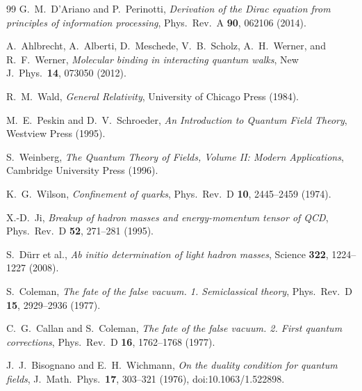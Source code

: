 \documentclass[12pt,a4paper]{article}
\theoremstyle{definition}
\theoremstyle{remark}
\begin{document}
\begin{thebibliography}{99}
G.~M.~D'Ariano and P.~Perinotti, \emph{Derivation of the Dirac equation from principles of information processing}, Phys.\ Rev.\ A \textbf{90}, 062106 (2014).

A.~Ahlbrecht, A.~Alberti, D.~Meschede, V.~B.~Scholz, A.~H.~Werner, and R.~F.~Werner, \emph{Molecular binding in interacting quantum walks}, New J.\ Phys.\ \textbf{14}, 073050 (2012).

R.~M.~Wald, \emph{General Relativity}, University of Chicago Press (1984).

M.~E.~Peskin and D.~V.~Schroeder, \emph{An Introduction to Quantum Field Theory}, Westview Press (1995).

S.~Weinberg, \emph{The Quantum Theory of Fields, Volume II: Modern Applications}, Cambridge University Press (1996).

K.~G.~Wilson, \emph{Confinement of quarks}, Phys.\ Rev.\ D \textbf{10}, 2445--2459 (1974).

X.-D.~Ji, \emph{Breakup of hadron masses and energy-momentum tensor of QCD}, Phys.\ Rev.\ D \textbf{52}, 271--281 (1995).

S.~D\"urr et al., \emph{Ab initio determination of light hadron masses}, Science \textbf{322}, 1224--1227 (2008).

S.~Coleman, \emph{The fate of the false vacuum. 1. Semiclassical theory}, Phys.\ Rev.\ D \textbf{15}, 2929--2936 (1977).

C.~G.~Callan and S.~Coleman, \emph{The fate of the false vacuum. 2. First quantum corrections}, Phys.\ Rev.\ D \textbf{16}, 1762--1768 (1977).

J.~J.~Bisognano and E.~H.~Wichmann, \emph{On the duality condition for quantum fields}, J.\ Math.\ Phys.\ \textbf{17}, 303--321 (1976), doi:10.1063/1.522898.

\end{thebibliography}
\end{document}
